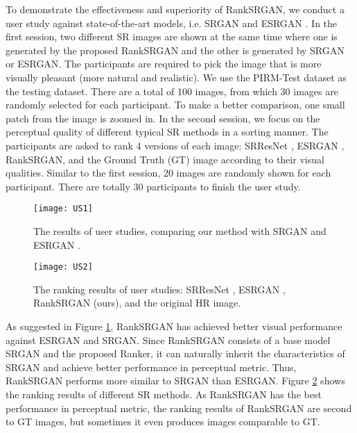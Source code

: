 \documentclass[10pt,twocolumn,letterpaper]{article}
\begin{document}
To demonstrate the effectiveness and superiority of RankSRGAN, we conduct a user study against state-of-the-art models, i.e. SRGAN \cite{ledig2017photo} and ESRGAN \cite{Wang_2018_ECCV_Workshops}. In the first session, two different SR images are shown at the same time where one is generated by the proposed RankSRGAN and the other is generated by SRGAN or ESRGAN. The participants are required to pick the image that is more visually pleasant (more natural and realistic). We use the PIRM-Test \cite{blau20182018} dataset as the testing dataset. There are a total of 100 images, from which 30 images are randomly selected for each participant. To make a better comparison, one small patch from the image is zoomed in. 
In the second session, we focus on the perceptual quality of different typical SR methods in a sorting manner. The participants are asked to rank 4 versions of each image: SRResNet \cite{ledig2017photo}, ESRGAN \cite{Wang_2018_ECCV_Workshops}, RankSRGAN, and the Ground Truth (GT) image according to their visual qualities. Similar to the first session, 20 images are randomly shown for each participant. There are totally 30 participants to finish the user study. 
\begin{figure}
\setlength{\abovecaptionskip}{-0.1cm}
\setlength{\belowcaptionskip}{-0.5cm}
\begin{center}
\texttt{[image: US1]} 
\end{center}
   \caption{The results of user studies, comparing our method with SRGAN  \cite{ledig2017photo} and ESRGAN \cite{Wang_2018_ECCV_Workshops}.}
\label{fig:user study1}
\end{figure}

\begin{figure}[h]
\setlength{\abovecaptionskip}{-0.1cm}
\setlength{\belowcaptionskip}{-0.3cm}
\begin{center}
\texttt{[image: US2]} 
\end{center}
   \caption{The ranking results of user studies: SRResNet \cite{ledig2017photo}, ESRGAN \cite{Wang_2018_ECCV_Workshops}, RankSRGAN (ours), and the original HR image.}
\label{fig:user study2}
\end{figure}


As suggested in Figure \ref{fig:user study1}, RankSRGAN has achieved better visual performance against ESRGAN and SRGAN. Since RankSRGAN consists of a base model SRGAN and the proposed Ranker, it can naturally inherit the characteristics of SRGAN and achieve better performance in perceptual metric. Thus, RankSRGAN performs more similar to SRGAN than ESRGAN. Figure \ref{fig:user study2} shows the ranking results of different SR methods. As RankSRGAN has the best performance in perceptual metric, the ranking results of RankSRGAN are second to GT images, but sometimes it even produces images comparable to GT. 
\end{document}
